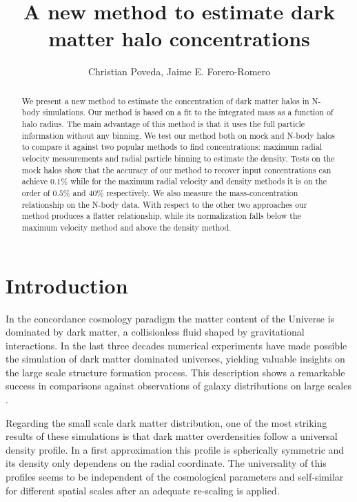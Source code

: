 \documentclass{emulateapj}
\begin{document}
\title{A new method to estimate dark matter halo concentrations}


\author{Christian Poveda, Jaime E. Forero-Romero}

\begin{abstract}

We present a new method to estimate the concentration of dark matter
halos in N-body simulations.
Our method is based on a fit to the integrated mass as a function of
halo radius.
The main advantage of this method is that it uses the full particle information
without any binning.
We test our method both on mock and N-body halos to compare it against
two popular methods to find concentrations: maximum radial velocity
measurements and radial particle binning to estimate the density.
Tests on the mock halos show that the accuracy of our method to
recover input concentrations can achieve $0.1\%$ while for the maximum
radial velocity and density methods it is on the order of $0.5\%$ and
$40\%$ respectively.
We also measure the mass-concentration relationship on the N-body
data.
With respect to the other two approaches our method produces a
flatter relationship, while its normalization falls below the maximum
velocity method and above the density method.
\end{abstract}



\section{Introduction}
\label{sec:introduction}
In the concordance cosmology paradigm the matter content of the
Universe is dominated by dark matter, a collisionless fluid shaped by
gravitational interactions.
In the last three decades numerical experiments have made possible the
simulation of dark matter dominated universes, yielding valuable
insights on the large scale structure formation process.
This description shows a remarkable success in comparisons against
observations of galaxy distributions on large scales
\citep{Springel2005,2011ApJ...740..102K}.

Regarding the small scale dark matter distribution, one of the most
striking results of these simulations is that dark matter overdensities
follow a universal density profile.
In a first approximation this profile is spherically symmetric and its
density only dependens on the radial coordinate.
The universality of this profiles seems to be independent of the
cosmological parameters and self-similar for different spatial scales
after an adequate re-scaling is applied.
\citep{NFW,Taylor2001}
\end{document}
